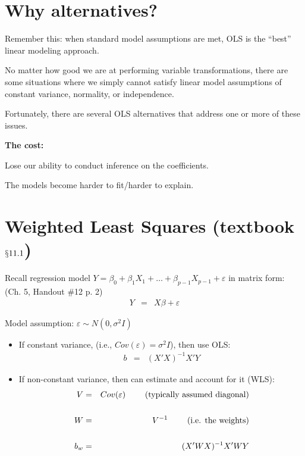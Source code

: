 \documentclass[12pt]{../notes}
\begin{document}

\section{Why alternatives?}
Remember this: when standard model assumptions are met, OLS is the ``best'' linear modeling approach. 

No matter how good we are at performing variable transformations, there are some situations where we simply cannot satisfy linear model assumptions of constant variance, normality, or independence. 

\nspace
Fortunately, there are several OLS alternatives that address one or more of these issues. 

\nspace
\textbf{The cost:} 
\bi
\item Lose our ability to conduct inference on the coefficients. 
\item The models become harder to fit/harder to explain. 
\ei

\section{Weighted Least Squares (textbook $\mathsection{11.1}$)}

\vspace{1em}

Recall regression model $Y = \beta_0 + \beta_1 X_1 + \ldots + \beta_{p-1}X_{p-1} + \varepsilon$ in matrix form:\\ (Ch. 5, Handout \#12 p. 2)
\begin{eqnarray}
  Y & = & X \beta + \varepsilon \nonumber
\end{eqnarray}

\vspace{2em}

Model assumption: $\varepsilon \sim N(0,\sigma^2 I)$

\begin{itemize}
  \item If constant variance, (i.e., $Cov(\varepsilon) = \sigma^2 I$), then use OLS:  
    \begin{eqnarray}
     b & = & (X' X)^{-1} X' Y \nonumber
    \end{eqnarray}
  \item If non-constant variance, then can estimate and account for it (WLS):
    \begin{eqnarray}
      V & = & Cov(\varepsilon)  \mbox{\hspace{2em} (typically assumed diagonal)}\nonumber \\
        &   & \nonumber \\
      W & = & V^{-1} \nonumber \mbox{\hspace{2em} (i.e. the weights)}\\
        &   & \nonumber \\
      b_w & = & (X' W X)^{-1} X' W Y \nonumber
    \end{eqnarray}
\end{itemize}
\end{document}
